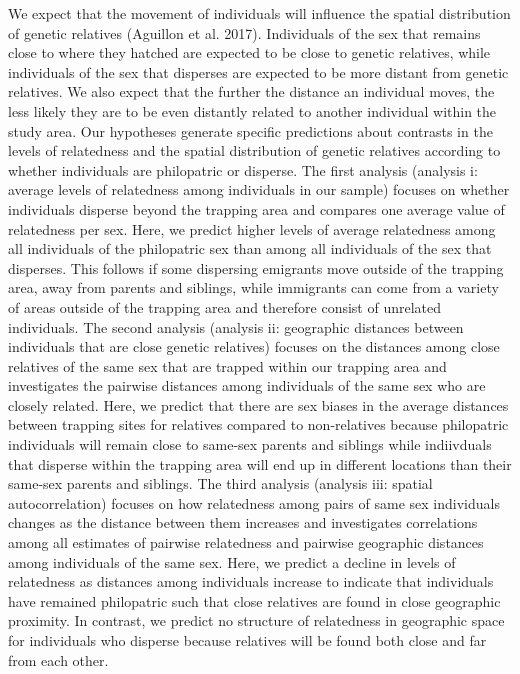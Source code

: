 \documentclass[]{article}
\begin{document}
We expect that the movement of individuals will influence the spatial
distribution of genetic relatives (Aguillon et al. 2017). Individuals of
the sex that remains close to where they hatched are expected to be
close to genetic relatives, while individuals of the sex that disperses
are expected to be more distant from genetic relatives. We also expect
that the further the distance an individual moves, the less likely they
are to be even distantly related to another individual within the study
area. Our hypotheses generate specific predictions about contrasts in
the levels of relatedness and the spatial distribution of genetic
relatives according to whether individuals are philopatric or disperse.
The first analysis (analysis i: average levels of relatedness among
individuals in our sample) focuses on whether individuals disperse
beyond the trapping area and compares one average value of relatedness
per sex. Here, we predict higher levels of average relatedness among all
individuals of the philopatric sex than among all individuals of the sex
that disperses. This follows if some dispersing emigrants move outside
of the trapping area, away from parents and siblings, while immigrants
can come from a variety of areas outside of the trapping area and
therefore consist of unrelated individuals. The second analysis
(analysis ii: geographic distances between individuals that are close
genetic relatives) focuses on the distances among close relatives of the
same sex that are trapped within our trapping area and investigates the
pairwise distances among individuals of the same sex who are closely
related. Here, we predict that there are sex biases in the average
distances between trapping sites for relatives compared to non-relatives
because philopatric individuals will remain close to same-sex parents
and siblings while indiivduals that disperse within the trapping area
will end up in different locations than their same-sex parents and
siblings. The third analysis (analysis iii: spatial autocorrelation)
focuses on how relatedness among pairs of same sex individuals changes
as the distance between them increases and investigates correlations
among all estimates of pairwise relatedness and pairwise geographic
distances among individuals of the same sex. Here, we predict a decline
in levels of relatedness as distances among individuals increase to
indicate that individuals have remained philopatric such that close
relatives are found in close geographic proximity. In contrast, we
predict no structure of relatedness in geographic space for individuals
who disperse because relatives will be found both close and far from
each other.
\end{document}
